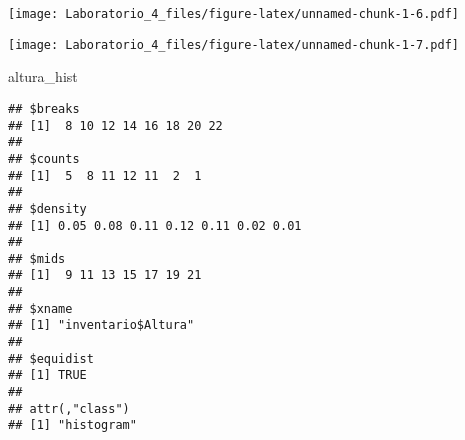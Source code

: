 \documentclass[
]{article}
\newenvironment{Shaded}{\begin{snugshade}}{\end{snugshade}}
\newcommand{\AttributeTok}[1]{\textcolor[rgb]{0.77,0.63,0.00}{#1}}
\newcommand{\CommentTok}[1]{\textcolor[rgb]{0.56,0.35,0.01}{\textit{#1}}}
\newcommand{\DecValTok}[1]{\textcolor[rgb]{0.00,0.00,0.81}{#1}}
\newcommand{\FunctionTok}[1]{\textcolor[rgb]{0.00,0.00,0.00}{#1}}
\newcommand{\NormalTok}[1]{#1}
\newcommand{\OtherTok}[1]{\textcolor[rgb]{0.56,0.35,0.01}{#1}}
\newcommand{\SpecialCharTok}[1]{\textcolor[rgb]{0.00,0.00,0.00}{#1}}
\newcommand{\StringTok}[1]{\textcolor[rgb]{0.31,0.60,0.02}{#1}}
\begin{document}
\begin{Shaded}
\end{Shaded}

\texttt{[image: Laboratorio\_4\_files/figure-latex/unnamed-chunk-1-6.pdf]}

\begin{Shaded}
\end{Shaded}

\texttt{[image: Laboratorio\_4\_files/figure-latex/unnamed-chunk-1-7.pdf]}

\begin{Shaded}
\begin{Highlighting}[]
\NormalTok{altura\_hist}
\end{Highlighting}
\end{Shaded}

\begin{verbatim}
## $breaks
## [1]  8 10 12 14 16 18 20 22
## 
## $counts
## [1]  5  8 11 12 11  2  1
## 
## $density
## [1] 0.05 0.08 0.11 0.12 0.11 0.02 0.01
## 
## $mids
## [1]  9 11 13 15 17 19 21
## 
## $xname
## [1] "inventario$Altura"
## 
## $equidist
## [1] TRUE
## 
## attr(,"class")
## [1] "histogram"
\end{verbatim}
\end{document}
